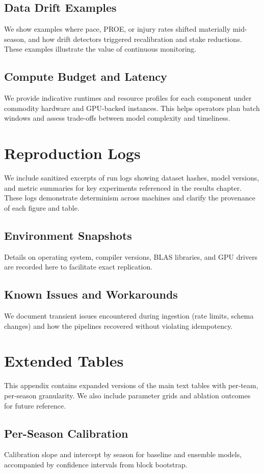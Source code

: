 \documentclass[12pt]{report}  %
\numberwithin{equation}{section}
\theoremstyle{plain}
\theoremstyle{definition}
\theoremstyle{remark}
\begin{document}
\section{Data Drift Examples}
We show examples where pace, PROE, or injury rates shifted materially mid-season, and how drift detectors triggered recalibration and stake reductions. These examples illustrate the value of continuous monitoring.

\section{Compute Budget and Latency}
We provide indicative runtimes and resource profiles for each component under commodity hardware and GPU-backed instances. This helps operators plan batch windows and assess trade-offs between model complexity and timeliness.

\iffalse %
\chapter{Reproduction Logs}
We include sanitized excerpts of run logs showing dataset hashes, model versions, and metric summaries for key experiments referenced in the results chapter. These logs demonstrate determinism across machines and clarify the provenance of each figure and table.

\section{Environment Snapshots}
Details on operating system, compiler versions, BLAS libraries, and GPU drivers are recorded here to facilitate exact replication.

\section{Known Issues and Workarounds}
We document transient issues encountered during ingestion (rate limits, schema changes) and how the pipelines recovered without violating idempotency.

\chapter{Extended Tables}
This appendix contains expanded versions of the main text tables with per-team, per-season granularity. We also include parameter grids and ablation outcomes for future reference.

\section{Per-Season Calibration}
Calibration slope and intercept by season for baseline and ensemble models, accompanied by confidence intervals from block bootstrap.
\end{document}
